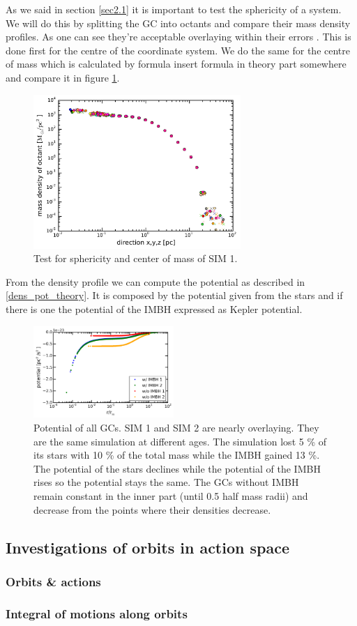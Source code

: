 \par As we said in section \ref{sec2.1} it is important to test the sphericity of a system. We will do this by splitting the \ac{GC} into octants and compare their mass density profiles. As one can see they're acceptable overlaying \color{red} within their errors \color{black}. This is done first for the centre of the coordinate system. We do the same for the centre of mass which is calculated by formula \color{red} insert formula in theory part somewhere \color{black} and compare it in figure \ref{fig:sphericity_com}.
\begin{figure}[htbp]
\centering
\includegraphics[width=0.7\textwidth]{Plots/sphericity_com.pdf}
\caption{Test for sphericity and center of mass of SIM 1.}
\label{fig:sphericity_com}
\end{figure}

\par From the density profile we can compute the potential as described in \ref{dens_pot_theory}. It is composed by the potential given from the stars and if there is one the potential of the \ac{IMBH} expressed as Kepler potential.
\begin{figure}[htbp]
	\centering
	\includegraphics[width=0.475\textwidth]{Plots/potential.png}
	\caption{Potential of all \acp{GC}. SIM 1 and SIM 2 are nearly overlaying. They are the same simulation at different ages. The simulation lost 5 \% of its stars with 10 \% of the total mass while the \ac{IMBH} gained 13 \%. The potential of the stars declines while the potential of the \ac{IMBH} rises so the potential stays the same. The \acp{GC} without \ac{IMBH} remain constant in the inner part (until 0.5 half mass radii) and decrease from the points where their densities decrease.}
\end{figure}


\subsection{Investigations of orbits in action space}
\subsubsection{Orbits \& actions}


\subsubsection{Integral of motions along orbits}

